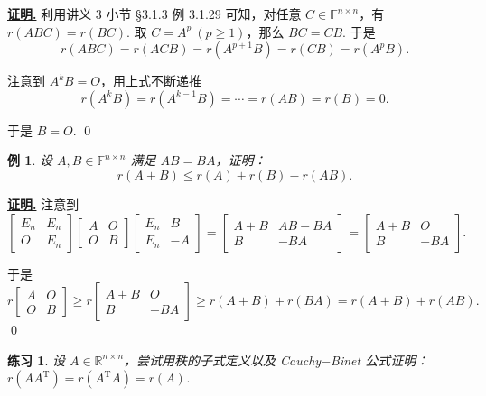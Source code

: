 \documentclass[10pt,openany]{article}
\theoremstyle{thmstyle} %
\newtheorem{practice}{练习}[section]
\theoremstyle{defstyle} %
\theoremstyle{prostyle} %
\theoremstyle{exastyle}
\newtheorem{example}[theorem]{例}
\theoremstyle{remstyle}
\renewenvironment{proof}[1][证明]{\par\underline{\textbf{#1.}} \;\fangsong}{\qed\par}
\newcommand{\T}{^{\text{T}}}
\newcommand{\F}{\mathbb{F}}
\newcommand{\R}{\mathbb{R}}
\newcommand{\n}{^{n \times n}}
\begin{document}
\begin{proof}
	利用讲义 3 小节 \S 3.1.3 例 3.1.29 可知，对任意 \( C \in \F\n \)，有 \( r(ABC)=r(BC) \). 取 \( C=A^p \ (p \geq 1) \)，那么 \( BC=CB \). 于是
	\[ r(ABC)=r(ACB)=r(A^{p+1}B)=r(CB)=r(A^pB). \] 
	
	注意到 \( A^kB=O \)，用上式不断递推
	\[ r(A^kB)=r(A^{k-1}B)=\cdots=r(AB)=r(B)=0. \]
	
	于是 \( B=O \).
\end{proof}

\begin{example}
	设 \( A,B \in \F\n \) 满足 \( AB=BA \)，证明：
	\[ r(A+B) \leq r(A)+r(B)-r(AB). \]
\end{example}

\begin{proof}
	注意到
	\[ \begin{bmatrix}
		E_n & E_n \\
		O & E_n
	\end{bmatrix}\begin{bmatrix}
		A & O \\
		O & B
	\end{bmatrix}\begin{bmatrix}
	E_n & B \\
	E_n & -A
	\end{bmatrix}=\begin{bmatrix}
	A+B & AB-BA \\
	B & -BA
	\end{bmatrix}=\begin{bmatrix}
	A+B & O \\
	B & -BA
	\end{bmatrix}. \]
	
	于是
	\[ r\begin{bmatrix}
		A & O \\
		O & B
	\end{bmatrix} \geq r\begin{bmatrix}
	A+B & O \\
	B & -BA
	\end{bmatrix} \geq r(A+B)+r(BA)=r(A+B)+r(AB). \]
\end{proof}

\begin{practice}
	设 \( A \in \R\n \)，尝试用秩的子式定义以及 Cauchy\(-\)Binet 公式证明：\( r(AA\T)=r(A\T A)=r(A) \).
\end{practice}
\end{document}
